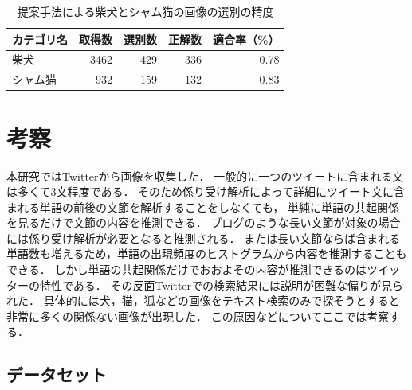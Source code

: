 \documentclass{deimj}
\begin{document}

\begin{table}[tb]
\begin{center}
\caption{提案手法による柴犬とシャム猫の画像の選別の精度}
\label{tab:result-shiba}
\begin{tabular}{|l|r|r|r|r|}\hline
カテゴリ名& 取得数& 選別数& 正解数& 適合率（\%） \\ \hline \hline

柴犬& 3462& 429& 336& 0.78 \\ \hline
シャム猫& 932& 159& 132& 0.83 \\ \hline
\end{tabular}
\end{center}
\end{table}

\section{考察}
\label{sec:examination}

本研究ではTwitterから画像を収集した．
一般的に一つのツイートに含まれる文は多くて3文程度である．
そのため係り受け解析によって詳細にツイート文に含まれる単語の前後の文節を解析することをしなくても，
単純に単語の共起関係を見るだけで文節の内容を推測できる．
ブログのような長い文節が対象の場合には係り受け解析が必要となると推測される．
または長い文節ならば含まれる単語数も増えるため，単語の出現頻度のヒストグラムから内容を推測することもできる．
しかし単語の共起関係だけでおおよその内容が推測できるのはツイッターの特性である．
その反面Twitterでの検索結果には説明が困難な偏りが見られた．
具体的には犬，猫，狐などの画像をテキスト検索のみで探そうとすると非常に多くの関係ない画像が出現した．
この原因などについてここでは考察する．



\subsection{データセット}
\end{document}
